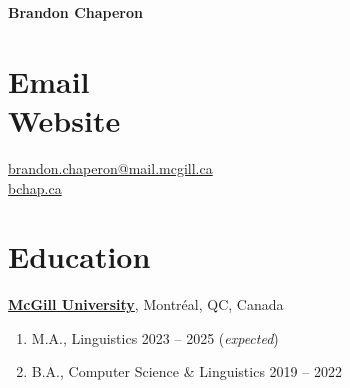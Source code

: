 \documentclass[margin,line]{resume}
\begin{document}
{\Large \textbf{Brandon Chaperon}}
\begin{resume}


	\section{\mysidestyle Email \vspace{0.3em}\\Website}
	\href{mailto:brandon.chaperon@mail.mcgill.ca}{%
		brandon.chaperon@mail.mcgill.ca
	}\vspace{0.3em}\\
	\href{https://bchaper0n.github.io/}{bchap.ca}



	\section{\mysidestyle Education}

	\href{https://www.mcgill.ca/}{\textbf{McGill University}}, Montréal, QC, Canada
	\begin{enumerate}[-, leftmargin=1em, topsep=4pt]
		\item[] M.A., %
		      Linguistics%
		      \hfill 2023 -- 2025 (\textit{expected})
		\item[] B.A., %
		      Computer Science %
		      \& %
		      Linguistics%
		      \hfill 2019 -- 2022
	\end{enumerate}


\end{resume}
\end{document}
